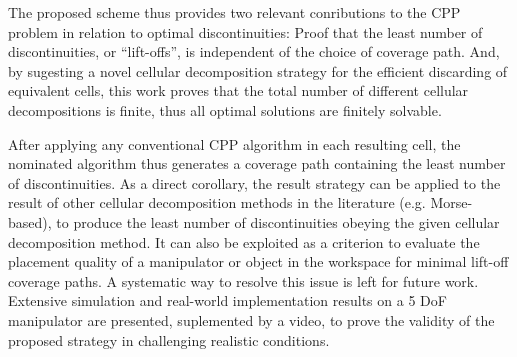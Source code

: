 \documentclass[journal]{IEEEtran}
\begin{document}
The proposed scheme thus provides two relevant conributions to the CPP problem in relation to optimal discontinuities:  
Proof that the least number of discontinuities, or ``lift-offs'', is independent of the choice of coverage path.  And,
by sugesting a novel cellular decomposition strategy for the efficient discarding of equivalent cells, this work proves 
that the total number of different cellular decompositions is finite, thus all optimal solutions are finitely solvable. 

After applying any conventional CPP algorithm in each resulting cell, the nominated algorithm thus generates a coverage path containing the least number of discontinuities. As a direct corollary, the result strategy can be applied to the result of other cellular decomposition methods in the literature (e.g. Morse-based), to produce the least number of discontinuities obeying the given cellular decomposition method. It can also be exploited as a criterion to evaluate the placement quality of a manipulator or object in the workspace for minimal lift-off coverage paths. A systematic way to resolve this issue is left for future work.
Extensive simulation and real-world implementation results on a 5 DoF manipulator are presented, suplemented by a video, to prove the validity of the proposed strategy in challenging realistic conditions.

%
%

\end{document}
